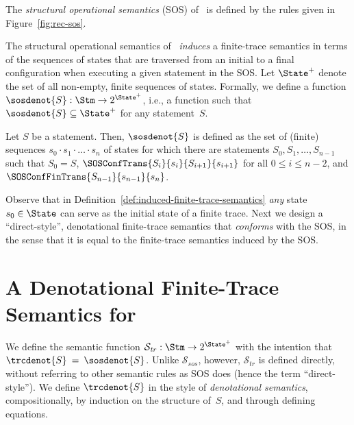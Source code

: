 \documentclass[a4paper,numberwithinsect]{lipics-v2021}
\newcommand{\rh}[1]{\marginpar{RH: #1}}
\begin{document}
\begin{definition}
  \label{def:rec-sos}
  The \emph{structural operational semantics} (SOS) of \Rec\ is
  defined by the rules given in Figure~\ref{fig:rec-sos}.
\end{definition}


The structural operational semantics of \Rec\ \emph{induces} a
finite-trace semantics in terms of the sequences of states that are
traversed from an initial to a final configuration when executing a
given statement in the SOS.
%
Let $\State^+$ denote the set of all non-empty, finite sequences of
states. Formally, we define a function
$\sosdenot{S} : \Stm \rightarrow 2^{\State^+}$, i.e., a function
such that $\sosdenot{S} \subseteq \State^+$ for any statement~$S$.

\begin{definition}
  \label{def:induced-finite-trace-semantics}
  Let $S$ be a statement. Then, $\sosdenot{S}$ is defined as the set
  of (finite) sequences $s_0 \cdot s_1 \cdot \ldots \cdot s_n$ of
  states for which there are statements $S_0, S_1, \ldots, S_{n-1}$
  such that $S_0 = S$, $\SOSConfTrans{S_i}{s_i}{S_{i+1}}{s_{i+1}}$ for
  all $0 \leq i \leq n-2$, and
  $\SOSConfFinTrans{S_{n-1}}{s_{n-1}}{s_n}$.
\end{definition}
% 
Observe that in Definition~\ref{def:induced-finite-trace-semantics}
\emph{any} state $s_0 \in \State$ can serve as the initial state of a
finite trace.
%
Next we design a ``direct-style'', denotational finite-trace semantics
that \emph{conforms} with the SOS, in the sense that it is equal to the
finite-trace semantics induced by the SOS.


\section{A Denotational Finite-Trace Semantics for \Rec}
\label{sec:rec-traces}

We define the semantic function
$\mathcal{S}_{\mathit{tr}} : \Stm \rightarrow 2^{\State^+}$ with the
intention that $ \trcdenot{S} \>=\> \sosdenot{S} $.
%
Unlike $\mathcal{S}_{sos}$, however, $\mathcal{S}_{\mathit{tr}}$ is
defined directly, without referring to other semantic rules as SOS
does (hence the term ``direct-style'').
%
%
We  define $\trcdenot{S}$ in the style of \emph{denotational 
semantics}, compositionally, by induction on the structure of~$S$, 
and through defining equations.
\end{document}
